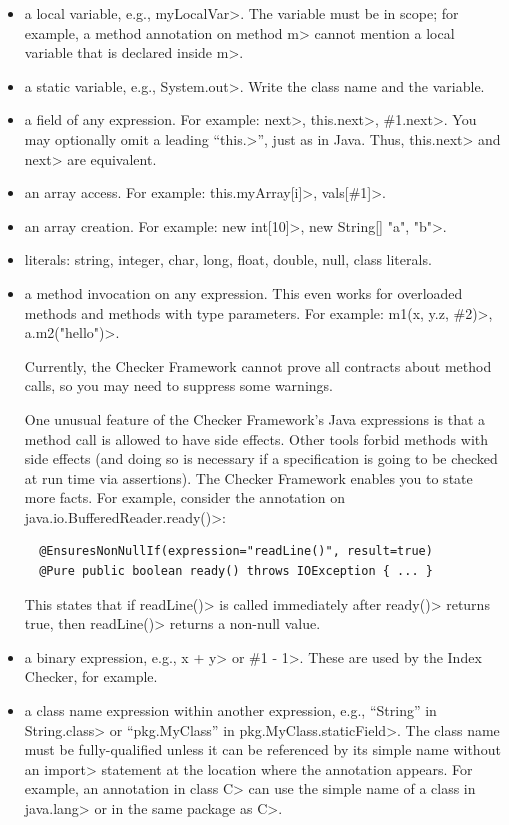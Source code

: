\begin{itemize}
\item
  a local variable, e.g., \<myLocalVar>.
  The variable must be in scope; for example, a method annotation on method
  \<m> cannot mention a local variable that is declared inside \<m>.

\item
  a static variable, e.g., \<System.out>.
  Write the class name and the variable.

\item
  a field of any expression.  For example:  \<next>,
  \<this.next>, \<\#1.next>. %
  You may optionally omit a leading ``\<this.>'', just as in Java.  Thus,
  \<this.next> and \<next> are equivalent.

\item
  an array access.  For example:  \<this.myArray[i]>, \<vals[\#1]>.

\item
  an array creation. For example: \<new int[10]>, \<new String[] {"a", "b"}>.

\item literals: string, integer, char, long, float, double, null, class literals.

\item a method invocation on any expression.
  This even works for overloaded methods and methods with type parameters.
  For example:
  \<m1(x, y.z, \#2)>, \<a.m2("hello")>.

  Currently, the Checker Framework cannot prove all contracts about method
  calls, so you may need to suppress some warnings.

  One unusual feature of the Checker Framework's Java expressions is that a
  method call is allowed to have side effects.  Other tools forbid methods
  with side effects (and doing so is necessary if a specification is going
  to be checked at run time via assertions).  The Checker Framework enables
  you to state more facts.  For example, consider the annotation on
  \<java.io.BufferedReader.ready()>:

\begin{Verbatim}
  @EnsuresNonNullIf(expression="readLine()", result=true)
  @Pure public boolean ready() throws IOException { ... }
\end{Verbatim}

  This states that if \<readLine()> is called immediately after \<ready()>
  returns true, then \<readLine()> returns a non-null value.

\item a binary expression, e.g., \<x + y> or \<\#1 - 1>.  These are used by
  the Index Checker, for example.

\item a class name expression within another expression, e.g., ``String''
  in \<String.class> or ``pkg.MyClass'' in \<pkg.MyClass.staticField>.  The
  class name must be fully-qualified unless it can be referenced by its
  simple name without an \<import> statement at the location where the
  annotation appears.  For example, an annotation in class \<C> can use the
  simple name of a class in \<java.lang> or in the same package as \<C>.

\end{itemize}

